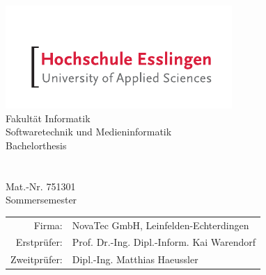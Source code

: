 \begin{titlepage}
	\begin{center}
		\includegraphics[scale=2.5]{bilder/hs-logo.pdf}\\
		\vspace{1cm} \Large Fakultät Informatik\\
		\vspace{0.5cm} \Large Softwaretechnik und Medieninformatik\\
		\vspace{1.25cm} \Large Bachelorthesis\\
		\vspace{0.5cm} \Huge \thetitle \\
		\vspace{1.5cm} \Large \theauthor \\
		\vspace{0.2cm} \small Mat.-Nr. 751301\\
		\vspace{0.5cm} \normalsize Sommersemester \the\year\\
		\vfill
		
		\begin{tabular}{rl}
			Firma: & NovaTec GmbH, Leinfelden-Echterdingen\\[0.3cm]
			Erstprüfer: & Prof. Dr.-Ing. Dipl.-Inform. Kai Warendorf\\ [0.1cm]
			Zweitprüfer: & Dipl.-Ing. Matthias Haeussler\\
		\end{tabular}
	\end{center}
\end{titlepage}
